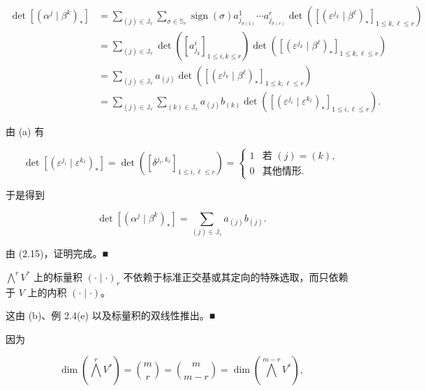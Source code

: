 \begin{remark}
\begin{items}
\begin{equation*}
\begin{aligned}
\det[(\alpha^{j} \mid \beta^{k})_{\ast}] &= \sum_{(j)\in\mathbb{J}_r}\sum_{\sigma\in\mathbb{S}_r} \operatorname{sign}(\sigma) a^{1}_{j_{\sigma(1)}} \cdots a^{r}_{j_{\sigma(r)}} \det\left(\left[(\varepsilon^{j_k} \mid \beta^{\ell})_{\ast}\right]_{1\le k,\ell\le r}\right) \\ &= \sum_{(j)\in\mathbb{J}_r} \det\left(\left[a^{i}_{j_k}\right]_{1\le i,k\le r}\right) \det\left(\left[(\varepsilon^{j_k} \mid \beta^{\ell})_{\ast}\right]_{1\le k,\ell\le r}\right) \\ &= \sum_{(j)\in\mathbb{J}_r} a_{(j)} \det\left(\left[(\varepsilon^{j_k} \mid \beta^{\ell})_{\ast}\right]_{1\le k,\ell\le r}\right) \\ &= \sum_{(j)\in\mathbb{J}_r}\sum_{(k)\in\mathbb{J}_r} a_{(j)}b_{(k)} \det\left(\left[(\varepsilon^{j_i} \mid \varepsilon^{k_{\ell}})_{\ast}\right]_{1\le i,\ell\le r}\right).
\end{aligned}
\end{equation*}

由 (a) 有

\begin{equation*}
\det[(\varepsilon^{j_i} \mid \varepsilon^{k_{\ell}})_{\ast}] = \det\left(\left[\delta^{j_i,k_{\ell}}\right]_{1\le i,\ell\le r}\right) = \begin{cases} 1 & \text{若 } (j) = (k), \\ 0 & \text{其他情形}. \end{cases}
\end{equation*}

于是得到

\[
\det[(\alpha^{j} \mid \beta^{k})_{\ast}] = \sum_{(j)\in\mathbb{J}_r} a_{(j)}b_{(j)}.
\]

由 (2.15)，证明完成。\nobreak\hspace{0.35em}■

\item

$ \bigwedge^{r}V^{*} $ 上的标量积 $ (\cdot \mid \cdot)_r $ 不依赖于标准正交基或其定向的特殊选取，而只依赖于 $ V $ 上的内积 $ (\cdot \mid \cdot) $。

\proofhead
这由 (b)、例 2.4(e) 以及标量积的双线性推出。\nobreak\hspace{0.35em}■
\end{items}

因为

\begin{equation}
\dim\left(\bigwedge^{r}V^{*}\right) = \binom{m}{r} = \binom{m}{m-r} = \dim\left(\bigwedge^{m-r}V^{*}\right),\tag{2.16}
\end{equation}


\end{remark}
